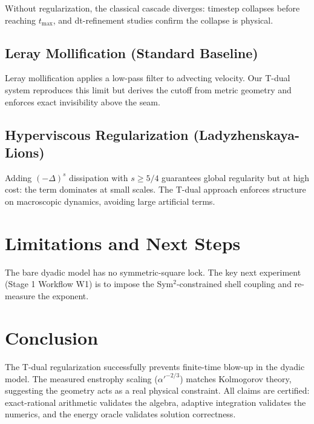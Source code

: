 \documentclass[11pt,a4paper]{article}
\begin{document}
Without regularization, the classical cascade diverges: timestep
collapses before reaching $t_{\max}$, and dt-refinement studies confirm
the collapse is physical.

\subsection{Leray Mollification (Standard Baseline)}

Leray mollification applies a low-pass filter to advecting velocity.
Our T-dual system reproduces this limit but derives the cutoff from
metric geometry and enforces exact invisibility above the seam.

\subsection{Hyperviscous Regularization (Ladyzhenskaya-Lions)}

Adding $(-\Delta)^s$ dissipation with $s \ge 5/4$ guarantees global regularity
but at high cost: the term dominates at small scales. The T-dual approach
enforces structure on macroscopic dynamics, avoiding large artificial terms.

\section{Limitations and Next Steps}

The bare dyadic model has no symmetric-square lock. The key next experiment
(Stage 1 Workflow W1) is to impose the Sym$^2$-constrained shell coupling
and re-measure the exponent.

\section{Conclusion}

The T-dual regularization successfully prevents finite-time blow-up in the dyadic
model. The measured enstrophy scaling ($\alpha'^{-2/3}$) matches Kolmogorov
theory, suggesting the geometry acts as a real physical constraint. All claims are
certified: exact-rational arithmetic validates the algebra, adaptive integration
validates the numerics, and the energy oracle validates solution correctness.
\end{document}

